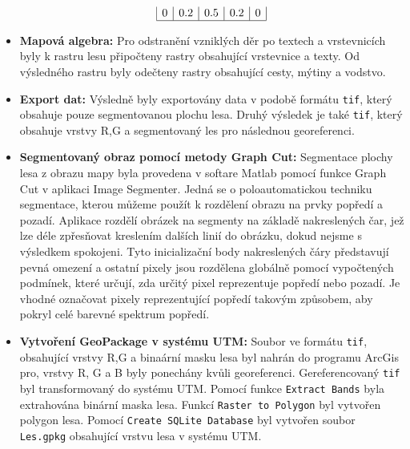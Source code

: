 \begin{itemize}
\[\begin{array}{|c|c|c|c|c|}
        0 & 0.2 & 0.5 & 0.2 & 0 \\
        \hline
    \end{array}
    \] 
    \item \textbf{Mapová algebra:}
    Pro odstranění vzniklých děr po textech a vrstevnicích byly k rastru lesu připočteny rastry obsahující vrstevnice a texty. Od výsledného rastru byly odečteny rastry obsahující cesty, mýtiny a vodstvo.
    \item \textbf{Export dat:}
    Výsledně byly exportovány data v podobě formátu \texttt{tif}, který obsahuje pouze segmentovanou plochu lesa. Druhý výsledek je také \texttt{tif}, který obsahuje vrstvy R,G a segmentovaný les pro následnou georeferenci.
    \item \textbf{Segmentovaný obraz pomocí metody Graph Cut:}
    Segmentace plochy lesa z obrazu mapy byla provedena v softare Matlab pomocí funkce Graph Cut v aplikaci Image Segmenter. Jedná se o poloautomatickou techniku segmentace, kterou můžeme použít k rozdělení obrazu na prvky popředí a pozadí. Aplikace rozdělí obrázek na segmenty na základě nakreslených čar, jež lze déle zpřesňovat kreslením dalších linií do obrázku, dokud nejsme s výsledkem spokojeni. Tyto inicializační body nakreslených čáry představují pevná omezení a ostatní pixely jsou rozdělena globálně pomocí vypočtených podmínek, které určují, zda určitý pixel reprezentuje popředí nebo pozadí. Je vhodné označovat pixely reprezentující popředí takovým způsobem, aby pokryl celé barevné spektrum popředí. \cite{mathworksGraphCut}
    \item \textbf{Vytvoření GeoPackage v systému UTM:}
    Soubor ve formátu \texttt{tif}, obsahující vrstvy R,G a binaární masku lesa byl nahrán do programu ArcGis pro, vrstvy R, G a B byly ponechány kvůli georeferenci. Gereferencovaný \texttt{tif} byl transformovaný do systému UTM. Pomocí funkce \texttt{Extract Bands} byla extrahována binární maska lesa. Funkcí \texttt{Raster to Polygon} byl vytvořen polygon lesa. Pomocí  \texttt{Create SQLite Database} byl vytvořen soubor \texttt{Les.gpkg} obsahující vrstvu lesa v systému UTM.
\end{itemize}
